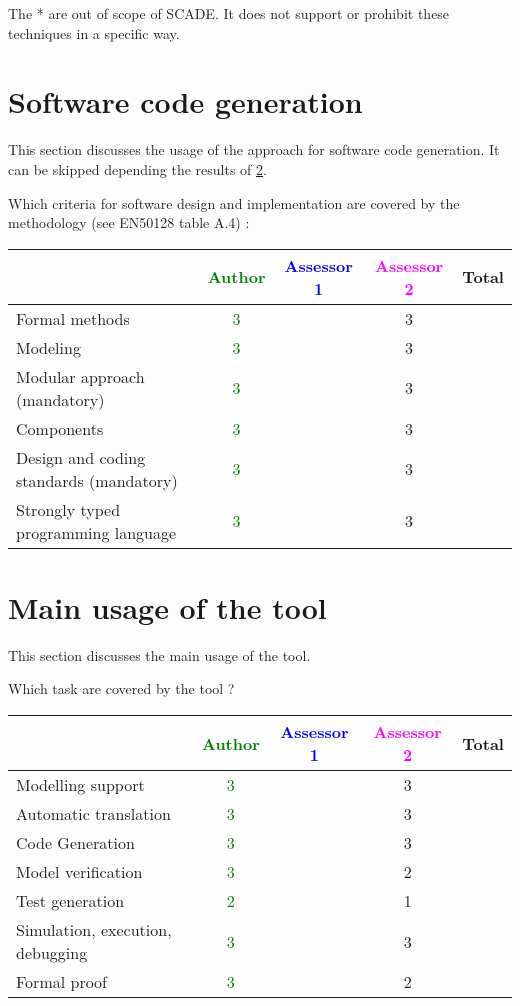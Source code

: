 \begin{author_comment}
The * are out of scope of SCADE. It does not support or prohibit these techniques in a specific way.   
\end{author_comment}


\section{Software code generation}
This section discusses the usage of the approach for software code generation.
It can be skipped depending the results of \ref{main_usage}.

Which criteria for software design and implementation are covered by the methodology
(see EN50128 table A.4) :

\begin{tabular}{|l | c | c | c | c|}
\hline
& \textcolor{green}{Author} & \textcolor{blue}{Assessor 1} & \textcolor{magenta}{Assessor 2} & Total \\
\hline
Formal methods  & \textcolor{green}{3} & &3 &  \\
\hline 
Modeling  & \textcolor{green}{3} & &3 &  \\
\hline
Modular approach (mandatory) & \textcolor{green}{3} & &3 &  \\
\hline
Components & \textcolor{green}{3} & &3 &  \\
\hline
Design and coding standards (mandatory) & \textcolor{green}{3} & &3 &  \\
\hline
Strongly typed programming language & \textcolor{green}{3} & &3 &  \\
\hline

\end{tabular}



\section{Main usage of the tool}
\label{main_usage}

This section discusses the main usage of the tool.

Which task are covered by the tool ?


\begin{tabular}{|l | c | c | c | c|}
\hline
& \textcolor{green}{Author} & \textcolor{blue}{Assessor 1} & \textcolor{magenta}{Assessor 2} & Total \\
\hline 
Modelling support & \textcolor{green}{3} & &3 &  \\
\hline
Automatic translation  & \textcolor{green}{3} & &3 & \\
\hline
Code Generation  & \textcolor{green}{3} & &3 & \\
\hline
Model verification & \textcolor{green}{3} & &2 & \\
\hline
Test generation & \textcolor{green}{2} & &1 & \\
\hline
Simulation, execution, debugging & \textcolor{green}{3} & &3 & \\
\hline
Formal proof & \textcolor{green}{3} & &2 & \\
\hline
\end{tabular}

